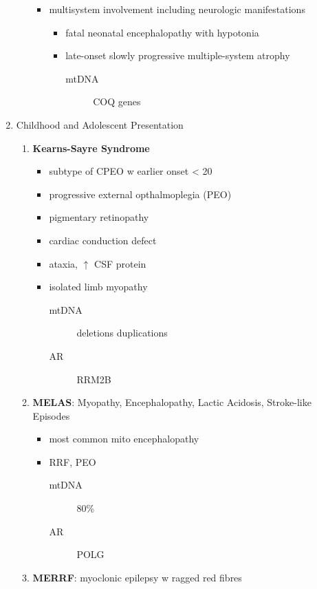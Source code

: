 \documentclass[12pt]{scrartcl}
\begin{document}
\begin{enumerate}
\begin{enumerate}
\label{sec:org5352016}
\begin{itemize}
\item multisystem involvement including neurologic manifestations
\begin{itemize}
\item fatal neonatal encephalopathy with hypotonia
\item late-onset slowly progressive multiple-system atrophy
\begin{description}
\item[{mtDNA}] COQ genes
\end{description}
\end{itemize}
\end{itemize}
\end{enumerate}
\item Childhood and Adolescent Presentation
\label{sec:org637a761}
\begin{enumerate}
\item \textbf{Kearns-Sayre Syndrome}
\label{sec:org90df818}
\begin{itemize}
\item subtype of CPEO w earlier onset \textless{} 20
\item progressive external opthalmoplegia (PEO)
\item pigmentary retinopathy
\item cardiac conduction defect
\item ataxia, \(\uparrow\) CSF protein
\item isolated limb myopathy
\begin{description}
\item[{mtDNA}] deletions \textpm{} duplications
\item[{AR}] RRM2B
\end{description}
\end{itemize}
\item \textbf{MELAS}: Myopathy, Encephalopathy, Lactic Acidosis, Stroke-like Episodes
\label{sec:orgfd2d4a3}
\begin{itemize}
\item most common mito encephalopathy
\item RRF, PEO
\begin{description}
\item[{mtDNA}] 80\%
\item[{AR}] POLG
\end{description}
\end{itemize}
\item \textbf{MERRF}: myoclonic epilepsy w ragged red fibres

\end{enumerate}
\end{enumerate}
\end{document}
